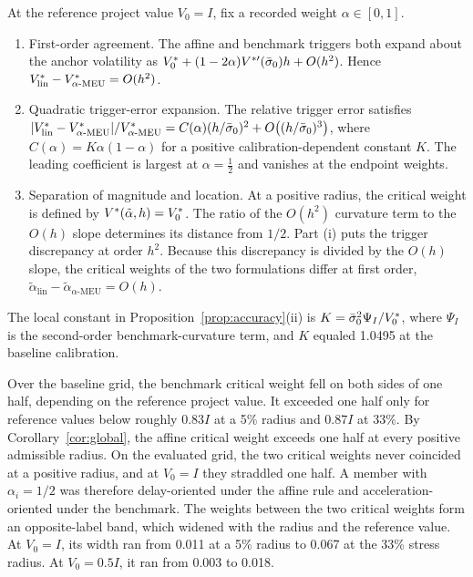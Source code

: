 \begin{proposition}\label{prop:accuracy}
At the reference project value $V_0=I$, fix a recorded weight $\alpha\in[0,1]$.
\begin{enumerate}
\item[(i)] First-order agreement. The affine and benchmark triggers both expand about the anchor volatility as $V^{*}_{0}+(1-2\alpha)V^{*\prime}(\bar{\sigma}_0)h+O(h^{2})$. Hence $V^{*}_{\mathrm{lin}}-V^{*}_{\alpha\text{-MEU}}=O(h^{2})$.
\item[(ii)] Quadratic trigger-error expansion. The relative trigger error satisfies $\lvert V^{*}_{\mathrm{lin}}-V^{*}_{\alpha\text{-MEU}}\rvert/V^{*}_{\alpha\text{-MEU}}=C(\alpha)(h/\bar{\sigma}_0)^{2}+O\bigl((h/\bar{\sigma}_0)^{3}\bigr)$, where $C(\alpha)=K\alpha(1-\alpha)$ for a positive calibration-dependent constant $K$. The leading coefficient is largest at $\alpha=\frac{1}{2}$ and vanishes at the endpoint weights.
\item[(iii)] Separation of magnitude and location. At a positive radius, the critical weight is defined by $V^{*}(\tilde{\alpha},h)=V^{*}_{0}$. The ratio of the $O(h^{2})$ curvature term to the $O(h)$ slope determines its distance from $1/2$. Part (i) puts the trigger discrepancy at order $h^{2}$. Because this discrepancy is divided by the $O(h)$ slope, the critical weights of the two formulations differ at first order, $\tilde{\alpha}_{\mathrm{lin}}-\tilde{\alpha}_{\alpha\text{-MEU}}=O(h)$.
\end{enumerate}
\end{proposition}

The local constant in Proposition~\ref{prop:accuracy}(ii) is $K=\bar{\sigma}_0^{2}\Psi_I/V^{*}_{0}$, where $\Psi_I$ is the second-order benchmark-curvature term, and $K$ equaled 1.0495 at the baseline calibration.

Over the baseline grid, the benchmark critical weight fell on both sides of one half, depending on the reference project value. It exceeded one half only for reference values below roughly $0.83I$ at a 5\% radius and $0.87I$ at 33\%. By Corollary~\ref{cor:global}, the affine critical weight exceeds one half at every positive admissible radius. On the evaluated grid, the two critical weights never coincided at a positive radius, and at $V_0=I$ they straddled one half. A member with $\alpha_i=1/2$ was therefore delay-oriented under the affine rule and acceleration-oriented under the benchmark. The weights between the two critical weights form an opposite-label band, which widened with the radius and the reference value. At $V_0=I$, its width ran from 0.011 at a 5\% radius to 0.067 at the 33\% stress radius. At $V_0=0.5I$, it ran from 0.003 to 0.018.

